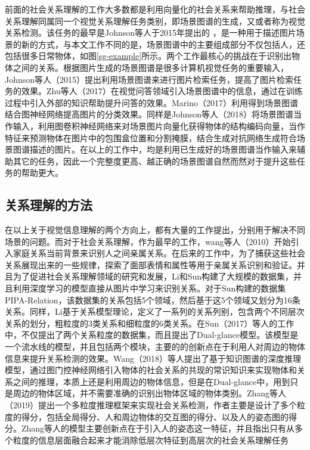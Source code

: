 前面的社会关系理解的工作大多数都是利用向量化的社会关系来帮助推理，与社会关系理解同属同一个视觉关系理解任务类别，即场景图谱的生成，又或者称为视觉关系检测。该任务的最早是Johnson等人于2015年提出的
\cite{johnson2015image}，是一种用于描述图片场景的新的方式，与本文工作不同的是，场景图谱中的主要组成部分不仅包括人，还包括很多日常物体，如图\ref{sg-example}所示。两个工作最核心的挑战在于识别出物体之间的关系。根据图片生成的场景图谱是很多计算机视觉任务的重要输入，Johnson等人（2015）\cite{johnson2015image}提出利用场景图谱来进行图片检索任务，提高了图片检索任务的效果。Zhu等人（2017）\cite{zhu2017knowledge}在视觉问答领域引入场景图谱中的信息，通过在训练过程中引入外部的知识帮助提升问答的效果。Marino（2017）\cite{marino2017the}利用得到场景图谱结合图神经网络提高图片的分类效果。同样是Johnson等人（2018）\cite{johnson2018image}将场景图谱当作输入，利用图卷积神经网络来对场景图片向量化获得物体的结构编码向量，当作特征来预测物体在图片中的包围盒位置和分割掩膜，结合生成对抗网络生成符合场景图谱描述的图片。在以上的工作中，均是利用已生成好的场景图谱当作输入来辅助其它的任务，因此一个完整度更高、越正确的场景图谱自然而然对于提升这些任务的帮助更大。

\subsection{关系理解的方法}
在以上关于视觉信息理解的两个方向上，都有大量的工作提出，分别用于解决不同场景的问题。而对于社会关系理解，作为最早的工作，wang等人（2010）开始引入家庭关系当前背景来识别人之间亲属关系。在后来的工作中\cite{dibeklioglu2013like,xia2012understanding,chen2012discovering}，为了捕获这些社会关系展现出来的一些规律，探索了面部表情和属性等用于亲属关系识别和验证。并且为了促进社会关系理解领域的研究和发展，Li\cite{li2017dual-glance}和Sun\cite{sun2017a}构建了大规模的数据集，并且利用深度学习的模型直接从图片中学习来识别关系。对于Sun构建的数据集PIPA-Relation，该数据集的关系包括5个领域，然后基于这5个领域又划分为16条关系。同样，Li基于关系模型理论，定义了一系列的关系列别，包含两个不同层次关系的划分，粗粒度的3类关系和细粒度的6类关系。在Sun（2017）等人的工作中，不仅提出了两个关系粒度的数据集，而且提出了Dual-glance模型。该模型是一个流水线的模型，并且包括两个模块，主要的的创新点在于利用人对周边的物体信息来提升关系检测的效果。Wang（2018）等人提出了基于知识图谱的深度推理模型，通过图门控神经网络引入物体的社会关系的共现的常识知识来实现物体和关系之间的推理，本质上还是利用周边的物体信息，但是在Dual-glance中，用到只是周边的物体区域，并不需要准确的识别出物体区域的物体类别。Zhang等人（2019）提出一个多粒度推理框架来实现社会关系检测，作者主要是设计了多个粒度的得分，包括全局得分、人和周边物体的交互图的得分、以及人的姿态图的得分。Zhang等人的模型主要创新点在于引入人的姿态这一特征，并且指出只有从多个粒度的信息层面融合起来才能消除低层次特征到高层次的社会关系理解任务

